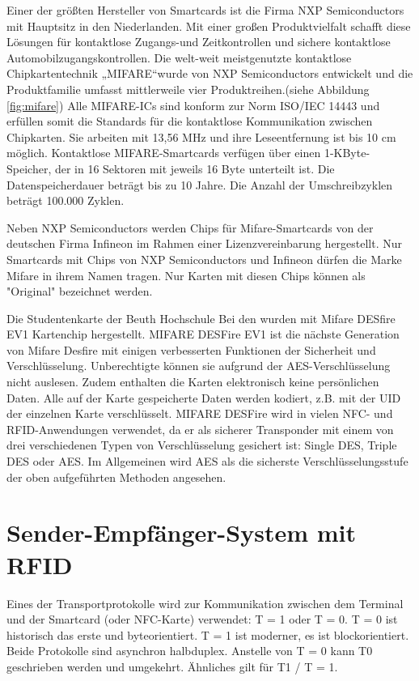 Einer der größten Hersteller von Smartcards ist die Firma NXP Semiconductors mit Hauptsitz in den Niederlanden. Mit einer großen Produktvielfalt schafft diese Lösungen für kontaktlose Zugangs-und Zeitkontrollen und sichere kontaktlose Automobilzugangskontrollen. Die welt-weit meistgenutzte kontaktlose Chipkartentechnik „MIFARE“wurde von NXP Semiconductors entwickelt und die Produktfamilie umfasst mittlerweile vier Produktreihen.(siehe Abbildung \ref{fig:mifare})\cite{website:9} Alle MIFARE-ICs sind konform zur Norm ISO/IEC 14443 und erfüllen somit die Standards für die kontaktlose Kommunikation zwischen Chipkarten. Sie arbeiten mit 13,56 MHz und ihre Leseentfernung ist bis 10 cm möglich. Kontaktlose MIFARE-Smartcards verfügen über einen 1-KByte-Speicher, der in 16 Sektoren mit jeweils 16 Byte unterteilt ist. Die Datenspeicherdauer beträgt bis zu 10 Jahre. Die Anzahl der Umschreibzyklen beträgt 100.000 Zyklen.

Neben NXP Semiconductors werden Chips für Mifare-Smartcards von der deutschen Firma Infineon im Rahmen einer Lizenzvereinbarung hergestellt. Nur Smartcards mit Chips von NXP Semiconductors und Infineon dürfen die Marke Mifare in ihrem Namen tragen. Nur Karten mit diesen Chips können als "Original" bezeichnet werden.

Die Studentenkarte der Beuth Hochschule Bei den wurden mit Mifare DESfire EV1 Kartenchip hergestellt. MIFARE DESFire EV1 ist die nächste Generation von Mifare Desfire mit einigen verbesserten Funktionen der Sicherheit und Verschlüsselung\cite[p.83]{chirico:smart_card}. Unberechtigte können sie aufgrund der AES-Verschlüsselung nicht auslesen. Zudem enthalten die Karten elektronisch keine persönlichen Daten. Alle auf der Karte gespeicherte Daten werden kodiert, z.B. mit der UID der einzelnen Karte verschlüsselt. MIFARE DESFire wird in vielen NFC- und RFID-Anwendungen verwendet, da er als sicherer Transponder mit einem von drei verschiedenen Typen von Verschlüsselung gesichert ist: Single DES, Triple DES oder AES. Im Allgemeinen wird AES als die sicherste Verschlüsselungsstufe der oben aufgeführten Methoden angesehen\cite{website:10}.


\section{Sender-Empfänger-System mit RFID}
\label{sec:theorie:rfid}
Eines der Transportprotokolle wird zur Kommunikation zwischen dem Terminal und der Smartcard (oder NFC-Karte) verwendet: T = 1 oder T = 0. T = 0 ist historisch das erste und byteorientiert. T = 1 ist moderner, es ist blockorientiert. Beide Protokolle sind asynchron halbduplex. Anstelle von T = 0 kann T0 geschrieben werden und umgekehrt. Ähnliches gilt für T1 / T = 1. 

